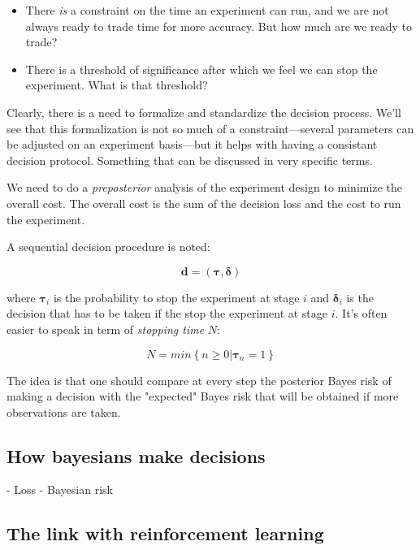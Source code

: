 \documentclass{tufte-book}
\begin{document}
\begin{itemize}
  \item There \textit{is} a constraint on the time an experiment can run, and we are not always ready to trade
    time for more accuracy. But how much are we ready to trade?
  \item There is a threshold of significance after which we feel we can stop the experiment. What is that
      threshold?
\end{itemize}

Clearly, there is a need to formalize and standardize the decision process. We'll see that this formalization
is not so much of a constraint---several parameters can be adjusted on an experiment basis---but it helps with
having a consistant decision protocol. Something that can be discussed in very specific terms.


We need to do a \textit{preposterior} analysis of the experiment design to minimize the overall cost. The
overall cost is the sum of the decision loss and the cost to run the experiment.

A sequential decision procedure is noted:

\begin{equation}
  \mathbf{d} = \left(\mathbf{\tau}, \mathbf{\delta}\right)
\end{equation}

where $\mathbf{\tau}_i$ is the probability to stop the experiment at stage $i$ and $\mathbf{\delta}_i$ is the
decision that has to be taken if the stop the experiment at stage $i$. It's often easier to speak in term of
\textit{stopping time} $N$:

\begin{equation}
  N = min\left\{n\geq0 | \mathbf{\tau}_n = 1\right\}
\end{equation}

The idea is that one should compare at every step the posterior Bayes risk of making a decision with the
"expected" Bayes risk that will be obtained if more observations are taken.



    \subsection{How bayesians make decisions}%
    \label{sub:how_bayesians_make_decisions}

- Loss
- Bayesian risk

    \subsection{The link with reinforcement learning}%
    \label{sub:the_link_with_reinforcement_learning}
\end{document}
